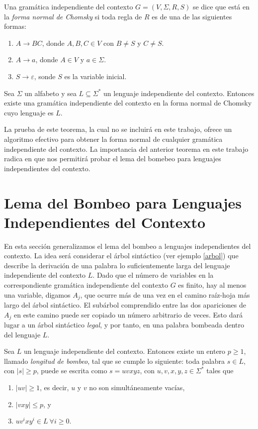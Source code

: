 \documentclass[twoside]{article}
\begin{document}
\begin{defi}
Una gramática independiente del contexto $G=(V,\Sigma,R,S)$ se dice que está en la \emph{forma normal de Chomsky} si toda regla de $R$ es de una de las siguientes formas:
\begin{enumerate}
\item $A\to BC$, donde $A,B,C\in V$ con $B\neq S$ y $C\neq S$. 
\item $A\to a$, donde $A\in V$ y $a\in\Sigma$.
\item $S\to\varepsilon$, sonde $S$ es la variable inicial. 
\end{enumerate}
\end{defi}

\begin{teorema}\label{chomsky}
Sea $\Sigma$ un alfabeto y sea $L\subseteq\Sigma^*$ un lenguaje independiente del contexto. Entonces existe una gramática independiente del contexto en la forma normal de Chomsky cuyo lenguaje es $L$. 
\end{teorema}

La prueba de este teorema, la cual no se incluirá en este trabajo, ofrece un algoritmo efectivo para obtener la forma normal de cualquier gramática independiente del contexto. La importancia del anterior teorema en este trabajo radica en que nos permitirá probar el lema del bomebeo para lenguajes independientes del contexto.

\section{Lema del Bombeo para Lenguajes Independientes del Contexto}
En esta sección generalizamos el lema del bombeo a lenguajes independientes del contexto. La idea será considerar el árbol sintáctico (ver ejemplo \ref{arbol}) que describe la derivación de una palabra lo suficientemente larga del lenguaje independiente del contexto $L$. Dado que el número de variables en la correspondiente gramática independiente del contexto $G$ es finito, hay al menos una variable, digamos $A_j$, que ocurre más de una vez en el camino raíz-hoja más largo del árbol sintáctico. El subárbol comprendido entre las dos apariciones de $A_j$ en este camino puede ser copiado un número arbitrario de veces. Esto dará lugar a un árbol sintáctico \emph{legal}, y por tanto, en una palabra bombeada dentro del lenguaje $L$. 

\begin{teorema}
Sea $L$ un lenguaje independiente del contexto. Entonces existe un entero $p\geq 1$, llamado \emph{longitud de bombeo}, tal que se cumple lo siguiente: toda palabra $s\in L$, con $|s|\geq p$, puede se escrita como $s=uvxyz$, con $u,v,x,y,z\in\Sigma^*$ tales que
\begin{enumerate}
\item $|uv|\geq 1$, es decir, $u$ y $v$ no son simultáneamente vacías,
\item $|vxy|\leq p$, y
\item $uv^ixy^i\in L\ \forall i\geq 0$.
\end{enumerate}
\end{teorema}
\end{document}

